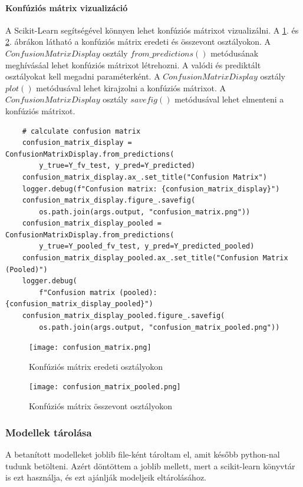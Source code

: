 \documentclass[12pt,a4paper]{article}
\begin{document}
\paragraph{Konfúziós mátrix vizualizáció}
A Scikit-Learn segítségével könnyen lehet konfúziós mátrixot vizualizálni. A \ref{fig:ConfusionMatrix}. és \ref{fig:ConfusionMatrixPooled}. ábrákon látható a konfúziós mátrix eredeti és összevont osztályokon.
A $ConfusionMatrixDisplay$ osztály $from\_predictions()$ metódusának meghívásáal lehet konfúziós mátrixot létrehozni. A valódi és prediktált osztályokat kell megadni paraméterként. A $ConfusionMatrixDisplay$ osztály $plot()$ metódusával lehet kirajzolni a konfúziós mátrixot. A $ConfusionMatrixDisplay$ osztály $savefig()$ metódusával lehet elmenteni a konfúziós mátrixot.


\begin{verbatim}
    # calculate confusion matrix
    confusion_matrix_display = ConfusionMatrixDisplay.from_predictions(
        y_true=Y_fv_test, y_pred=Y_predicted)
    confusion_matrix_display.ax_.set_title("Confusion Matrix")
    logger.debug(f"Confusion matrix: {confusion_matrix_display}")
    confusion_matrix_display.figure_.savefig(
        os.path.join(args.output, "confusion_matrix.png"))
    confusion_matrix_display_pooled = ConfusionMatrixDisplay.from_predictions(
        y_true=Y_pooled_fv_test, y_pred=Y_predicted_pooled)
    confusion_matrix_display_pooled.ax_.set_title("Confusion Matrix (Pooled)")
    logger.debug(
        f"Confusion matrix (pooled): {confusion_matrix_display_pooled}")
    confusion_matrix_display_pooled.figure_.savefig(
        os.path.join(args.output, "confusion_matrix_pooled.png")) 
\end{verbatim}

\begin{figure}[htbp]
    \centering
    \texttt{[image: confusion\_matrix.png]}
    \caption{Konfúziós mátrix eredeti osztályokon}
    \label{fig:ConfusionMatrix}
\end{figure}

\begin{figure}[htbp]
    \centering
    \texttt{[image: confusion\_matrix\_pooled.png]}
    \caption{Konfúziós mátrix összevont osztályokon}
    \label{fig:ConfusionMatrixPooled}
\end{figure}

\subsubsection{Modellek tárolása}
A betanított modelleket joblib file-ként tároltam el, amit később python-nal tudunk betölteni. Azért döntöttem a joblib mellett, mert a scikit-learn könyvtár
is ezt használja, és ezt ajánlják modeljeik eltárolásához.
\end{document}
